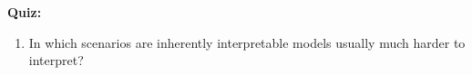 \textbf{Quiz:}
\begin{enumerate}
   	\item In which scenarios are inherently interpretable models usually much harder to interpret?  
\end{enumerate}